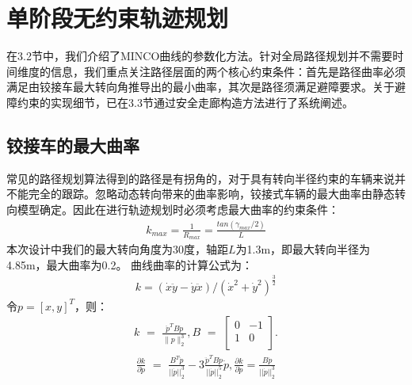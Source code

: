 \documentclass[master,academic]{ysuthesis} %
\begin{document}
	\section{单阶段无约束轨迹规划}
	在3.2节中，我们介绍了MINCO曲线的参数化方法。针对全局路径规划并不需要时间维度的信息，我们重点关注路径层面的两个核心约束条件：首先是路径曲率必须满足由铰接车最大转向角推导出的最小曲率，其次是路径须满足避障要求。关于避障约束的实现细节，已在3.3节通过安全走廊构造方法进行了系统阐述。
		\subsection{铰接车的最大曲率}
		常见的路径规划算法得到的路径是有拐角的，对于具有转向半径约束的车辆来说并不能完全的跟踪。忽略动态转向带来的曲率影响，铰接式车辆的最大曲率由静态转向模型确定。因此在进行轨迹规划时必须考虑最大曲率的约束条件：
		\begin{equation}
			\begin{aligned}
				k_{max}=\frac{1}{R_{max}}=\frac{tan( \gamma _{max}/2 )}{L}
			\end{aligned}
		\end{equation}
		本次设计中我们的最大转向角度为30度，轴距$L$为1.3m，即最大转向半径为4.85m，最大曲率为0.2。
		曲线曲率的计算公式为：
		\begin{equation}
			\begin{aligned}
				k=( \dot{x}\ddot{y}-\dot{y}\ddot{x} ) /( \dot{x}^2+\dot{y}^2 ) ^{\frac{3}{2}}
			\end{aligned}
		\end{equation}
		令$p =[x,y]^T$，则：
		\begin{equation}
			\begin{aligned}
				k\,\,=\,\,\frac{\ddot{p}^TB\dot{p}}{\lVert p \rVert _{2}^{3}},B\,\,=\,\,\left[ \begin{matrix}
					0&		-1\\
					1&		0\\
				\end{matrix} \right] .
			\end{aligned}
			\label{eq:曲线曲率k}
		\end{equation}
		\begin{equation}
			\begin{aligned}
				\frac{\partial k}{\partial \dot{p}}\,\,=\,\,\frac{B^T\ddot{p}}{||\dot{p}||_{2}^{3}}-3\frac{\ddot{p}^TB\dot{p}}{||\dot{p}||_{2}^{5}}\dot{p},\frac{\partial k}{\partial \ddot{p}}=\frac{B\dot{p}}{||\dot{p}||_{2}^{3}}
			\end{aligned}
		\end{equation}
\end{document}
